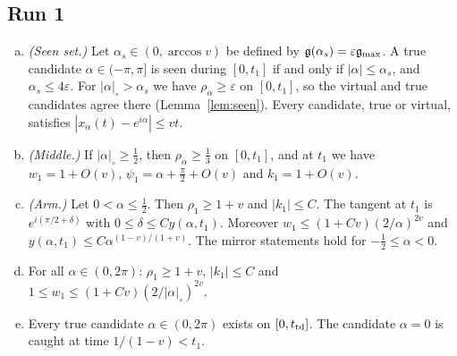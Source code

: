 \subsection{Run 1}\label{app:B-run1}

\begin{lemma}[Run 1]\label{lem:B-run1}
\begin{enumerate}[(a)]\setlength{\itemsep}{1pt}
\item \emph{(Seen set.)} Let $\alpha_s\in(0,\arccos v)$ be defined by $\mathfrak{g}(\alpha_s)=\varepsilon\mathfrak{g}_{\max}$. A true candidate
$\alpha\in(-\pi,\pi]$ is seen during $[0,t_1]$ if and only if $|\alpha|\le\alpha_s$, and $\alpha_s\le4\varepsilon$. For
$|\alpha|_\circ>\alpha_s$ we have $\rho_\alpha\ge\varepsilon$ on $[0,t_1]$, so the virtual and true candidates agree there
(Lemma~\ref{lem:seen}). Every candidate, true or virtual, satisfies $|x_\alpha(t)-e^{i\alpha}|\le vt$.
\item \emph{(Middle.)} If $|\alpha|_\circ\ge\frac12$, then $\rho_\alpha\ge\frac13$ on $[0,t_1]$, and at $t_1$ we have $w_1=1+O(v)$,
$\psi_1=\alpha+\frac\pi2+O(v)$ and $k_1=1+O(v)$.
\item \emph{(Arm.)} Let $0<\alpha\le\frac12$. Then $\rho_1\ge1+v$ and $|k_1|\le C$. The tangent at $t_1$ is $e^{i(\pi/2+\delta)}$ with
$0\le\delta\le Cy(\alpha,t_1)$. Moreover $w_1\le(1+Cv)(2/\alpha)^{2v}$ and $y(\alpha,t_1)\le C\alpha^{(1-v)/(1+v)}$. The mirror
statements hold for $-\frac12\le\alpha<0$.
\item For all $\alpha\in(0,2\pi)$: $\rho_1\ge1+v$, $|k_1|\le C$ and $1\le w_1\le(1+Cv)(2/|\alpha|_\circ)^{2v}$.
\item Every true candidate $\alpha\in(0,2\pi)$ exists on $[0,t_{\mathrm{td}}]$. The candidate $\alpha=0$ is caught at time $1/(1-v)<t_1$.
\end{enumerate}
\end{lemma}
